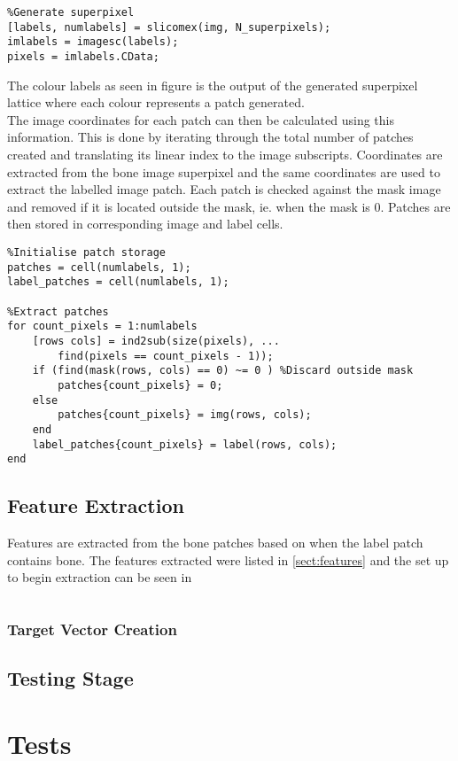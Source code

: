 \begin{lstlisting}
%Generate superpixel
[labels, numlabels] = slicomex(img, N_superpixels);
imlabels = imagesc(labels);
pixels = imlabels.CData;

\end{lstlisting}
The colour labels as seen in figure  is the output of the generated superpixel lattice where each colour represents a patch generated.
\\[1\baselineskip]
\vspace{60mm}
The image coordinates for each patch can then be calculated using this information. This is done by iterating through the total number of patches created and translating its linear index to the image subscripts. Coordinates are extracted from the bone image superpixel and the same coordinates are used to extract the labelled image patch. Each patch is checked against the mask image and removed if it is located outside the mask, ie. when the mask is 0. Patches are then stored in corresponding image and label cells.

\begin{lstlisting}
%Initialise patch storage
patches = cell(numlabels, 1);
label_patches = cell(numlabels, 1);

%Extract patches
for count_pixels = 1:numlabels
    [rows cols] = ind2sub(size(pixels), ...
        find(pixels == count_pixels - 1));
    if (find(mask(rows, cols) == 0) ~= 0 ) %Discard outside mask
        patches{count_pixels} = 0; 
    else
        patches{count_pixels} = img(rows, cols);
    end
    label_patches{count_pixels} = label(rows, cols);
end
\end{lstlisting} 

\subsection{Feature Extraction}
Features are extracted from the bone patches based on when the label patch contains bone. The features extracted were listed in \ref{sect:features} and the set up to begin extraction can be seen in


\begin{lstlisting}

\end{lstlisting}



\subsubsection{Target Vector Creation}
\subsection{Testing Stage}
\label{sect: teststage}

\section{Tests}